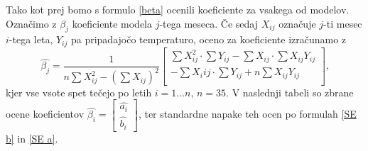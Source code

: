 \documentclass{article}
\begin{document}
Tako kot prej bomo s formulo \ref{beta} ocenili koeficiente za vsakega od modelov. Označimo z $\beta_j$ koeficiente modela
$j$-tega meseca. Če sedaj $X_{ij}$ označuje $j$-ti mesec $i$-tega leta, $Y_{ij}$ pa pripadajočo temperaturo, oceno za koeficiente
izračunamo z 
\begin{equation*}
    \hat{\beta_j} = \frac{1}{n \sum X^2_{ij} - \left( \sum X_{ij} \right)^2 } 
    \begin{bmatrix}
        \sum X_{ij}^2 \cdot \sum Y_{ij} - \sum X_{ij} \cdot \sum X_{ij} Y_{ij}  \\
        - \sum X_i{ij} \cdot \sum Y_{ij} + n \sum X_{ij} Y_{ij}  \\
    \end{bmatrix} \text{,}
\end{equation*}
kjer vse vsote spet tečejo po letih $i = 1 \dots n\text{, } n = 35$. V naslednji tabeli so 
zbrane ocene koeficientov 
$\hat{\beta_i} = 
\begin{bmatrix}
    \hat{a_i}\\
    \hat{b_i}
\end{bmatrix}$,
ter standardne napake teh ocen po formulah \ref{SE b} in \ref{SE a}.
\end{document}
